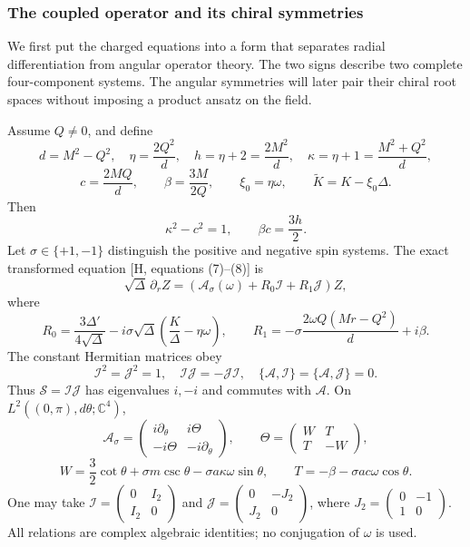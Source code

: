 \documentclass[11pt,a4paper]{article}
\begin{document}
\subsubsection{The coupled operator and its chiral symmetries}\label{readable-source-algebra}

We first put the charged equations into a form that separates radial differentiation from angular operator theory. The two signs describe two complete four-component systems. The angular symmetries will later pair their chiral root spaces without imposing a product ansatz on the field.

Assume \(Q\ne0\), and define \[
 d=M^2-Q^2,\quad \eta=\frac{2Q^2}{d},\quad
 h=\eta+2=\frac{2M^2}{d},\quad
 \kappa=\eta+1=\frac{M^2+Q^2}{d},
\] \[
 c=\frac{2MQ}{d},\qquad \beta=\frac{3M}{2Q},\qquad
 \xi_0=\eta\omega,\qquad \widetilde K=K-\xi_0\Delta .
\] Then \[
 \kappa^2-c^2=1,\qquad \beta c=\frac{3h}{2}.
 \tag{1}
\] Let \(\sigma\in\{+1,-1\}\) distinguish the positive and negative spin
systems. The exact transformed equation {[}H, equations (7)--(8){]} is
\[
 \sqrt\Delta\,\partial_r Z
 =(\mathcal A_\sigma(\omega)+R_0\mathcal I+R_1\mathcal J)Z,
 \tag{2}
\] where \[
 R_0=\frac{3\Delta'}{4\sqrt\Delta}
       -i\sigma\sqrt\Delta\left(\frac K\Delta-\eta\omega\right),\qquad
 R_1=-\sigma\frac{2\omega Q(Mr-Q^2)}d+i\beta.
 \tag{3}
\] The constant Hermitian matrices obey \[
 \mathcal I^2=\mathcal J^2=1,\quad
 \mathcal I\mathcal J=-\mathcal J\mathcal I,\quad
 \{\mathcal A,\mathcal I\}=\{\mathcal A,\mathcal J\}=0.
 \tag{4}
\] Thus \(\mathcal S=\mathcal I\mathcal J\) has eigenvalues \(i,-i\) and
commutes with \(\mathcal A\). On \(L^2((0,\pi),d\theta;\mathbb C^4)\),
\[
 \mathcal A_\sigma=
 \begin{pmatrix}i\partial_\theta&i\Theta\\-i\Theta&-i\partial_\theta\end{pmatrix},
 \qquad \Theta=\begin{pmatrix}W&T\\T&-W\end{pmatrix},
 \tag{5}
\] \[
 W=\frac32\cot\theta+\sigma m\csc\theta-\sigma a\kappa\omega\sin\theta,
 \qquad T=-\beta-\sigma ac\omega\cos\theta.
\] One may take
\(\mathcal I=\left(\begin{smallmatrix}0&I_2\\I_2&0\end{smallmatrix}\right)\)
and
\(\mathcal J=\left(\begin{smallmatrix}0&-J_2\\J_2&0\end{smallmatrix}\right)\),
where
\(J_2=\left(\begin{smallmatrix}0&-1\\1&0\end{smallmatrix}\right)\). All
relations are complex algebraic identities; no conjugation of \(\omega\)
is used.
\end{document}
